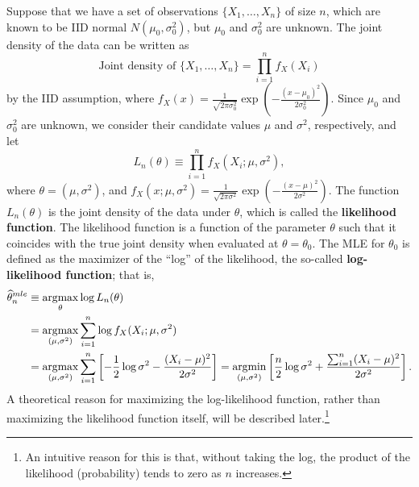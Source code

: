 \documentclass[11pt, A4paper, openany, uplatex]{book}
\begin{document}
\begin{example}\label{ex:normal}\upshape
Suppose that we have a set of observations $\{X_1, \ldots, X_n\}$ of size $n$, which are known to be IID normal $N(\mu_0, \sigma_0^2)$, but $\mu_0$ and $\sigma_0^2$ are unknown.
The joint density of the data can be written as
\[
	\text{Joint density of $\{X_1, \ldots, X_n\}$} = \prod_{i=1}^n f_X(X_i)
\] 
by the IID assumption, where $f_X(x) = \frac{1}{\sqrt{2 \pi \sigma_0^2}}\exp\left(-\frac{(x - \mu_0)^2}{2 \sigma_0^2}\right)$.
Since $\mu_0$ and $\sigma_0^2$ are unknown, we consider their candidate values $\mu$ and $\sigma^2$, respectively, and let
\[
	L_n(\theta) \equiv \prod_{i=1}^n f_X(X_i; \mu, \sigma^2),
\]
where $\theta = (\mu, \sigma^2)$, and $f_X(x; \mu, \sigma^2) = \frac{1}{\sqrt{2 \pi \sigma^2}}\exp\left(-\frac{(x - \mu)^2}{2 \sigma^2}\right)$.
The function $L_n(\theta)$ is the joint density of the data under $\theta$, which is called the \textbf{likelihood function}.
The likelihood function is a function of the parameter $\theta$ such that it coincides with the true joint density when evaluated at $\theta = \theta_0$.
The MLE for $\theta_0$ is defined as the maximizer of the ``log'' of the likelihood, the so-called \textbf{log-likelihood function}; that is,
\begin{align}\label{eq:mle-normal}
\begin{split}
	\widehat{\theta}^{mle}_n 
		& \equiv \operatorname*{\arg\!\max}_{\theta} \log L_n(\theta) \\
		& = \operatorname*{\arg\!\max}_{(\mu, \sigma^2)} \sum_{i=1}^n \log f_X(X_i; \mu, \sigma^2)\\
		& = \operatorname*{\arg\!\max}_{(\mu, \sigma^2)} \sum_{i=1}^n \left[ - \frac{1}{2}\log \sigma^2 - \frac{(X_i - \mu)^2}{2 \sigma^2}\right] = \operatorname*{\arg\!\min}_{(\mu, \sigma^2)}  \left[ \frac{n}{2}\log \sigma^2 + \frac{\sum_{i=1}^n (X_i - \mu)^2}{2 \sigma^2}\right].
\end{split}
\end{align}
A theoretical reason for maximizing the log-likelihood function, rather than maximizing the likelihood function itself, will be described later.\footnote{
	An intuitive reason for this is that, without taking the log, the product of the likelihood (probability) tends to zero as $n$ increases.
	}


\end{example}
\end{document}
